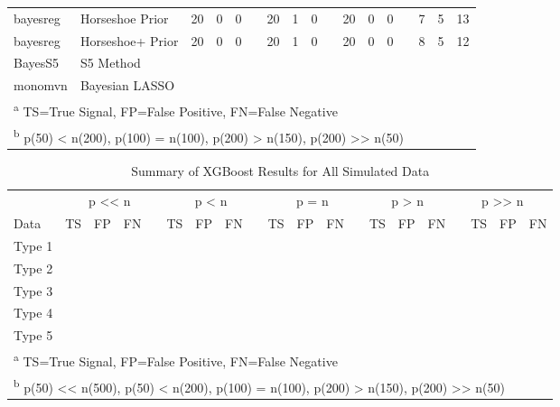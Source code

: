 \documentclass[
  11pt,
]{article}
\begin{document}
\begin{table}[!h]
\begin{tabular}[t]{>{}l|>{}l|>{}l|>{}l|>{}l|>{}l|>{}l|>{}l|>{}l|>{}l|>{}l|>{}l|>{}l|>{}l|>{}l|>{}l|>{}l|}
\hspace{1em}bayesreg & Horseshoe Prior & 20 & 0 & 0 &  & 20 & 1 & 0 &  & 20 & 0 & 0 &  & 7 & 5 & 13\\
\hspace{1em}bayesreg & Horseshoe+ Prior & 20 & 0 & 0 &  & 20 & 1 & 0 &  & 20 & 0 & 0 &  & 8 & 5 & 12\\
\hspace{1em}BayesS5 & S5 Method &  &  &  &  &  &  &  &  &  &  &  &  &  &  & \\
\hspace{1em}monomvn & Bayesian LASSO &  &  &  &  &  &  &  &  &  &  &  &  &  &  & \\
\bottomrule
\multicolumn{17}{l}{\textsuperscript{a} TS=True Signal, FP=False Positive, FN=False Negative}\\
\multicolumn{17}{l}{\textsuperscript{b} p(50) < n(200), p(100) = n(100), p(200) > n(150), p(200) >> n(50)}\\
\end{tabular}
\end{table}

\begin{table}[!h]

\caption{\label{tab:Results XGBoost}Summary of XGBoost Results for All Simulated Data}
\centering
\fontsize{8.5}{10.5}\selectfont
\begin{tabular}[t]{>{}l|>{}l|>{}l|>{}l|>{}l|>{}l|>{}l|>{}l|>{}l|>{}l|>{}l|>{}l|>{}l|>{}l|>{}l|>{}l|>{}l|>{}l|>{}l|>{}l|}
\toprule
\multicolumn{1}{c}{ } & \multicolumn{4}{c}{p << n} & \multicolumn{4}{c}{p < n} & \multicolumn{4}{c}{p = n} & \multicolumn{3}{c}{p > n} & \multicolumn{4}{c}{p >> n} \\
\cmidrule(l{3pt}r{3pt}){2-5} \cmidrule(l{3pt}r{3pt}){6-9} \cmidrule(l{3pt}r{3pt}){10-13} \cmidrule(l{3pt}r{3pt}){14-16} \cmidrule(l{3pt}r{3pt}){17-20}
Data & TS & FP & FN &  & TS & FP & FN &  & TS & FP & FN &  & TS & FP & FN &  & TS & FP & FN\\
\midrule
Type 1 &  &  &  &  &  &  &  &  &  &  &  &  &  &  &  &  &  &  & \\
Type 2 &  &  &  &  &  &  &  &  &  &  &  &  &  &  &  &  &  &  & \\
Type 3 &  &  &  &  &  &  &  &  &  &  &  &  &  &  &  &  &  &  & \\
Type 4 &  &  &  &  &  &  &  &  &  &  &  &  &  &  &  &  &  &  & \\
Type 5 &  &  &  &  &  &  &  &  &  &  &  &  &  &  &  &  &  &  & \\
\bottomrule
\multicolumn{20}{l}{\textsuperscript{a} TS=True Signal, FP=False Positive, FN=False Negative}\\
\multicolumn{20}{l}{\textsuperscript{b} p(50) << n(500), p(50) < n(200), p(100) = n(100), p(200) > n(150), p(200) >> n(50)}\\
\end{tabular}
\end{table}
\end{document}
